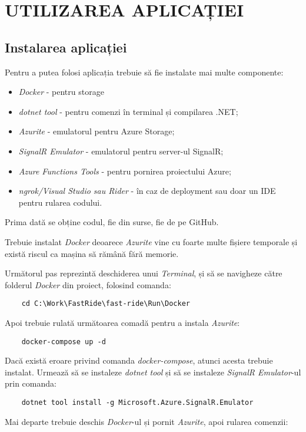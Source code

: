 \chapter{UTILIZAREA APLICAȚIEI}

\section{Instalarea aplicației}

Pentru a putea folosi aplicația trebuie să fie instalate mai multe componente:
\begin{itemize}
    \item \textit{Docker} - pentru storage
    \item \textit{dotnet tool} - pentru comenzi în terminal și compilarea .NET;
    \item \textit{Azurite} - emulatorul pentru Azure Storage;
    \item \textit{SignalR Emulator} - emulatorul pentru server-ul SignalR;
    \item \textit{Azure Functions Tools} - pentru pornirea proiectului Azure;
    \item \textit{ngrok/Visual Studio sau Rider} - în caz de deployment sau doar un IDE pentru rularea codului.
\end{itemize}

Prima dată se obține codul, fie din surse, fie de pe GitHub.

Trebuie instalat \textit{Docker} deoarece \textit{Azurite} vine cu foarte multe fișiere temporale și
există riscul ca mașina să rămână fără memorie.

Următorul pas reprezintă deschiderea unui \textit{Terminal}, și să se navigheze către folderul \textit{Docker} din proiect, folosind
comanda:
\begin{verbatim}
    cd C:\Work\FastRide\fast-ride\Run\Docker
\end{verbatim}
Apoi trebuie rulată următoarea comadă pentru a instala \textit{Azurite}:
\begin{verbatim}
    docker-compose up -d
\end{verbatim}
Dacă există eroare privind comanda \textit{docker-compose}, atunci acesta trebuie instalat.
Urmează să se instaleze \textit{dotnet tool} și să se instaleze \textit{SignalR Emulator}-ul prin comanda:
\begin{verbatim}
    dotnet tool install -g Microsoft.Azure.SignalR.Emulator
\end{verbatim}

Mai departe trebuie deschis \textit{Docker}-ul și pornit \textit{Azurite}, apoi rularea comenzii:

